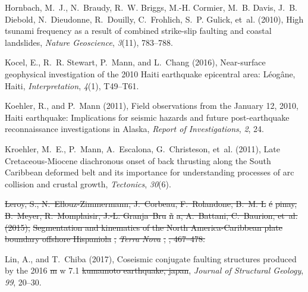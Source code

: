 \documentclass[linenumbers,draft]{agujournal}
\providecommand{\DIFaddtex}[1]{{\protect\color{blue}\uwave{#1}}} %
\providecommand{\DIFdeltex}[1]{{\protect\color{red}\sout{#1}}}                      %
\providecommand{\DIFaddbegin}{} %
\providecommand{\DIFaddend}{} %
\providecommand{\DIFdelbegin}{} %
\providecommand{\DIFdelend}{} %
\providecommand{\DIFadd}[1]{\texorpdfstring{\DIFaddtex{#1}}{#1}} %
\providecommand{\DIFdel}[1]{\texorpdfstring{\DIFdeltex{#1}}{}} %
\begin{document}
\begin{thebibliography}{65}
Hornbach, M.~J., N.~Braudy, R.~W. Briggs, M.-H. Cormier, M.~B. Davis, J.~B.
  Diebold, N.~Dieudonne, R.~Douilly, C.~Frohlich, S.~P. Gulick, et~al. (2010),
  High tsunami frequency as a result of combined strike-slip faulting and
  coastal landslides, \textit{Nature Geoscience}, \textit{3}(11), 783--788.

Kocel, E., R.~R. Stewart, P.~Mann, and L.~Chang (2016), {Near-surface
  geophysical investigation of the 2010 Haiti earthquake epicentral area:
  L{\'e}og{\^a}ne, Haiti}, \textit{Interpretation}, \textit{4}(1), T49--T61.

Koehler, R., and P.~Mann (2011), {Field observations from the January 12, 2010,
  Haiti earthquake: Implications for seismic hazards and future post-earthquake
  reconnaissance investigations in Alaska}, \textit{Report of Investigations},
  \textit{2}, 24.

Kroehler, M.~E., P.~Mann, A.~Escalona, G.~Christeson, et~al. (2011), {Late
  Cretaceous-Miocene diachronous onset of back thrusting along the South
  Caribbean deformed belt and its importance for understanding processes of arc
  collision and crustal growth}, \textit{Tectonics}, \textit{30}(6).

\DIFdelbegin %
\DIFdel{Leroy, S., N.~Ellouz-Zimmermann, J.~Corbeau, F.~Rolandone, B.~M. L}%
\DIFdel{\'e}%
\DIFdel{pinay,
  B.~Meyer, R.~Momplaisir, J.-L. Granja~Bru}%
\DIFdel{\~n}%
\DIFdel{a, A.~Battani, C.~Baurion,
  et~al. (2015), }%
\DIFdel{Segmentation and kinematics of the North America-Caribbean
  plate boundary offshore Hispaniola}%
\DIFdel{, }\textit{\DIFdel{Terra Nova}}%
\DIFdel{, }%
\DIFdel{,
  467--478.
}%

\DIFdelend {}
Lin, A., and T.~Chiba (2017), \DIFaddbegin {\DIFaddend Coseismic conjugate faulting structures produced
  by the 2016 \DIFdelbegin \DIFdel{m }\DIFdelend \DIFaddbegin \DIFadd{M }\DIFaddend w 7.1 \DIFdelbegin \DIFdel{kumamoto earthquake, japan}\DIFdelend \DIFaddbegin \DIFadd{Kumamoto earthquake, Japan}}\DIFaddend , \textit{Journal of
  Structural Geology}, \textit{99}, 20--30.


\end{thebibliography}
\end{document}
